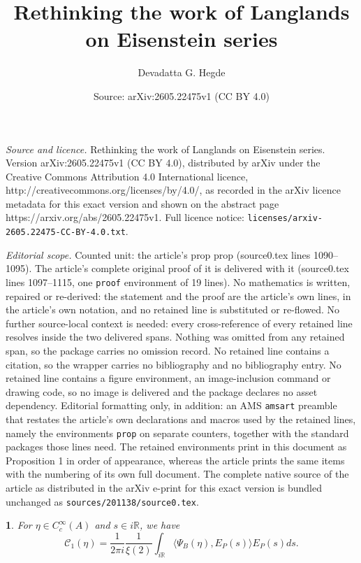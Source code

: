 \documentclass[10pt,a4paper]{amsart}
\title{Rethinking the work of Langlands on Eisenstein series}
\author{Devadatta G. Hegde}
\date{Source: arXiv:2605.22475v1 (CC BY 4.0)}
\newtheorem{prop}{}
\begin{document}
\maketitle

\noindent\emph{Source and licence.} Rethinking the work of Langlands on Eisenstein series. Version arXiv:2605.22475v1 (CC BY 4.0), distributed by arXiv under the Creative Commons Attribution 4.0 International licence, http://creativecommons.org/licenses/by/4.0/, as recorded in the arXiv licence metadata for this exact version and shown on the abstract page https://arxiv.org/abs/2605.22475v1. Full licence notice: \texttt{licenses/arxiv-2605.22475-CC-BY-4.0.txt}.\par\smallskip

\noindent\textit{Editorial scope.} Counted unit: the article's prop prop (source0.tex lines 1090--1095). The article's complete original proof of it is delivered with it (source0.tex lines 1097--1115, one \texttt{proof} environment of 19 lines). No mathematics is written, repaired or re-derived: the statement and the proof are the article's own lines, in the article's own notation, and no retained line is substituted or re-flowed.  No further source-local context is needed: every cross-reference of every retained line resolves inside the two delivered spans.  Nothing was omitted from any retained span, so the package carries no omission record.  No retained line contains a citation, so the wrapper carries no bibliography and no bibliography entry.  No retained line contains a figure environment, an image-inclusion command or drawing code, so no image is delivered and the package declares no asset dependency.  Editorial formatting only, in addition: an AMS \texttt{amsart} preamble that restates the article's own declarations and macros used by the retained lines, namely the environments \texttt{prop} on separate counters, together with the standard packages those lines need.  The retained environments print in this document as Proposition 1 in order of appearance, whereas the article prints the same items with the numbering of its own full document.  The complete native source of the article as distributed in the arXiv e-print for this exact version is bundled unchanged as \texttt{sources/201138/source0.tex}.
\begin{prop}
For $\eta\in C_{c}^{\infty}(A)$ and $s\in i\mathbb{R}$, we have
\[
\mathcal{C}_{1}(\eta)=\frac{1}{2\pi i}\frac{1}{\xi(2)}\int_{i\mathbb{R}}\langle\Psi_{B}(\eta),E_{P}(s)\rangle E_{P}(s)ds.
\]
\end{prop}
\end{document}
